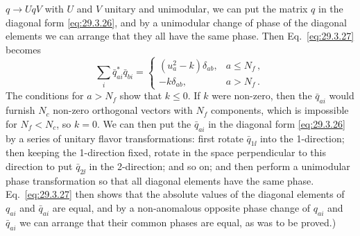 \(q\longrightarrow UqV\) with \(U\) and \(V\) unitary and unimodular, we
can put the matrix \(q\) in the diagonal form \eqref{eq:29.3.26}, and by a
unimodular change of phase of the diagonal elements we can arrange that
they all have the same phase. Then Eq.~\eqref{eq:29.3.27} becomes
\[
  \sum_i\bar q_{ai}^*\bar q_{bi}
  =
  \begin{cases}
    (u_a^2-k)\delta_{ab}, & a\leq N_f\,,\\
    -k\delta_{ab}, & a>N_f\,.
  \end{cases}
\]
The conditions for \(a>N_f\) show that \(k\leq0\). If \(k\) were
non-zero, then the \(\bar q_{ai}\) would furnish \(N_c\) non-zero
orthogonal vectors with \(N_f\) components, which is impossible for
\(N_f<N_c\), so \(k=0\). We can then put the \(\bar q_{ai}\) in the
diagonal form \eqref{eq:29.3.26} by a series of unitary flavor
transformations: first rotate \(\bar q_{1\ii}\) into the 1-direction; then
keeping the 1-direction fixed, rotate in the space perpendicular to this
direction to put \(\bar q_{2\ii}\) in the 2-direction; and so on; and then
perform a unimodular phase transformation so that all diagonal elements
have the same phase. Eq.~\eqref{eq:29.3.27} then shows that the absolute
values of the diagonal elements of \(q_{ai}\) and \(\bar q_{ai}\) are
equal, and by a non-anomalous opposite phase change of \(q_{ai}\) and
\(\bar q_{ai}\) we can arrange that their common phases are equal, as was
to be proved.)

